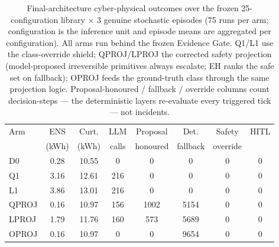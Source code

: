\begin{table}[t]
\centering\small
\caption{Final-architecture cyber-physical outcomes over the frozen
25-configuration library $\times$ 3 genuine stochastic episodes (75 runs per
arm; configuration is the inference unit and episode means are aggregated
per configuration). All arms run behind the frozen Evidence Gate. Q1/L1 use
the class-override shield; QPROJ/LPROJ the corrected safety projection
(model-proposed irreversible primitives always escalate; EH ranks the safe
set on fallback); OPROJ feeds the ground-truth class through the same
projection logic. Proposal-honoured / fallback / override columns count
decision-steps --- the deterministic layers re-evaluate every triggered
tick --- not incidents.}
\label{tab:projection}
\begin{tabular}{lccccccc}
\toprule
Arm & ENS & Curt. & LLM & Proposal & Det. & Safety & HITL \\
 & (kWh) & (kWh) & calls & honoured & fallback & override & \\
\midrule
D0 & 0.28 & 10.55 & 0 & 0 & 0 & 0 & 0 \\
Q1 & 3.16 & 12.61 & 216 & 0 & 0 & 0 & 0 \\
L1 & 3.86 & 13.01 & 216 & 0 & 0 & 0 & 0 \\
QPROJ & 0.16 & 10.97 & 156 & 1002 & 5154 & 0 & 0 \\
LPROJ & 1.79 & 11.76 & 160 & 573 & 5689 & 0 & 0 \\
OPROJ & 0.16 & 10.97 & 0 & 0 & 9654 & 0 & 0 \\
\bottomrule
\end{tabular}
\end{table}
